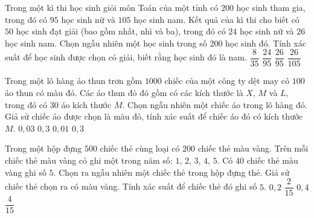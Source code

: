 \begin{ex}%
	Trong một kì thi học sinh giỏi môn Toán của một tỉnh có $200$ học sinh tham gia, trong đó có $95$ học sinh nữ và $105$ học sinh nam. Kết quả của kì thi cho biết có $50$ học sinh đạt giải (bao gồm nhất, nhì và ba), trong đó có $24$ học sinh nữ và $26$ học sinh nam. Chọn ngẫu nhiên một học sinh trong số $200$ học sinh đó. Tính xác suất để học sinh được chọn có giải, biết rằng học sinh đó là nam.
	\choice
	{$\dfrac{8}{35}$}
	{$\dfrac{24}{95}$}
	{$\dfrac{26}{95}$}
	{\True $\dfrac{26}{105}$}
\end{ex}

\begin{ex}%
	Trong một lô hàng áo thun trơn gồm $1000$ chiếc của một công ty dệt may có $100$ áo thun có màu đỏ. Các áo thun đỏ đó gồm có các kích thước là $X$, $M$ và $L$, trong đó có $30$ áo kích thước $M$. Chọn ngẫu nhiên một chiếc áo trong lô hàng đó. Giả sử chiếc áo được chọn là màu đỏ, tính xác suất để chiếc áo đó có kích thước $M$.
	\choice
	{$0{,}03$}
	{\True $0{,}3$}
	{$0{,}01$}
	{$0{,}3$}
\end{ex}

\begin{ex}%
	Trong một hộp đựng $500$ chiếc thẻ cùng loại có $200$ chiếc thẻ màu vàng. Trên mỗi chiếc thẻ màu vàng có ghi một trong năm số: $1$, $2$, $3$, $4$, $5$. Có $40$ chiếc thẻ màu vàng ghi số $5$. Chọn ra ngẫu nhiên một chiếc thẻ trong hộp đựng thẻ. Giả sử chiếc thẻ chọn ra có màu vàng. Tính xác suất để chiếc thẻ đó ghi số $5$.
	\choice
	{\True $0{,}2$}
	{$\dfrac{2}{15}$}
	{$0{,}4$}
	{$\dfrac{4}{15}$}
\end{ex}	


